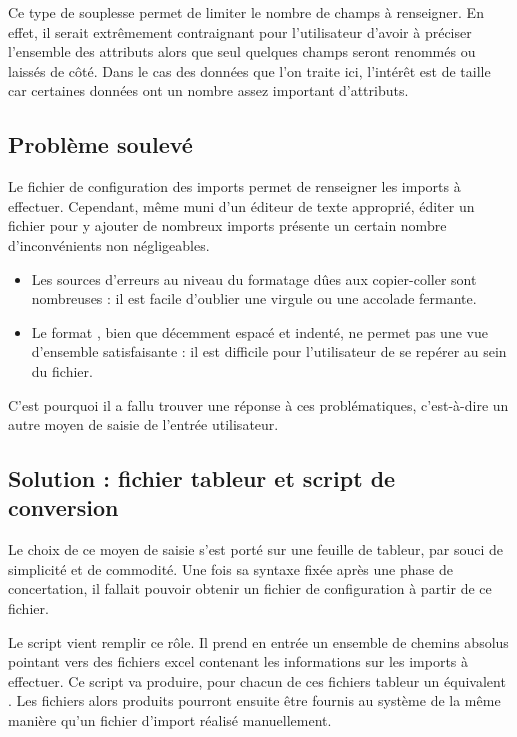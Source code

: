 Ce type de souplesse permet de limiter le nombre de champs à renseigner. En effet, il serait extrêmement contraignant pour l'utilisateur d'avoir à préciser l'ensemble des attributs alors que seul quelques champs seront renommés ou laissés de côté. Dans le cas des données que l'on traite ici, l'intérêt est de taille car certaines données ont un nombre assez important d'attributs.

    \subsection{Problème soulevé}

Le fichier  de configuration des imports permet de renseigner les imports à effectuer. Cependant, même muni d'un éditeur de texte approprié, éditer un fichier  pour y ajouter de nombreux imports présente un certain nombre d'inconvénients non négligeables.

\begin{itemize}
  \item Les sources d'erreurs au niveau du formatage dûes aux copier-coller sont nombreuses : il est facile d'oublier une virgule ou une accolade fermante.
  \item Le format , bien que décemment espacé et indenté, ne permet pas une vue d'ensemble satisfaisante : il est difficile pour l'utilisateur de se repérer au sein du fichier.
\end{itemize}

C'est pourquoi il a fallu trouver une réponse à ces problématiques, c'est-à-dire un autre moyen de saisie de l'entrée utilisateur.

    \subsection{Solution : fichier tableur et script de conversion}

Le choix de ce moyen de saisie s'est porté sur une feuille de tableur, par souci de simplicité et de commodité. Une fois sa syntaxe fixée après une phase de concertation, il fallait pouvoir obtenir un fichier de configuration  à partir de ce fichier.

Le script  vient remplir ce rôle. Il prend en entrée un ensemble de chemins absolus pointant vers des fichiers excel contenant les informations sur les imports à effectuer. Ce script va produire, pour chacun de ces fichiers tableur un équivalent . Les fichiers  alors produits pourront ensuite être fournis au système de la même manière qu'un fichier d'import réalisé manuellement.

